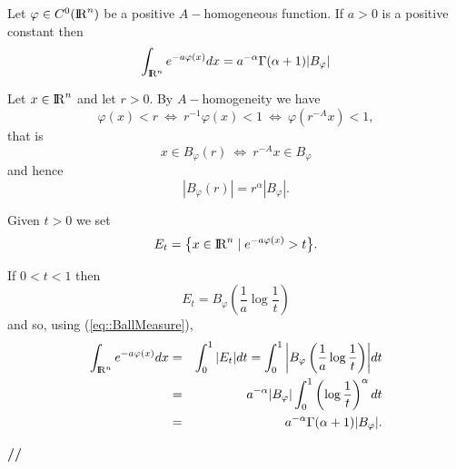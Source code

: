 \documentclass[12pt,a4paper]{amsart}
\begin{document}
{\begin{proposition}\label{prop::GbellIntegral}
Let ${\varphi}\in C^0({{\rm I\kern-.185em R}}^{n})$ be a positive
${A}-$homogeneous function.
If ${a}>0$ is a positive constant then
\begin{equation}\label{eq::GbellIntegral}
\int_{{{\rm I\kern-.185em R}}^{n}}e^{-a{\varphi}({x})}d{x}
=a^{-{\alpha}}\Gamma({\alpha}+1)|{B}_{\varphi}|
\end{equation}
\end{proposition}

{\removelastskip\par\medskip\goodbreak{}}
Let ${x}\in{{\rm I\kern-.185em R}}^{n}$ and let ${r}>0$.
By ${A}-$homogeneity we have
\begin{equation}\nonumber
	{\varphi}({x})<{r}\ \Longleftrightarrow\ 
	{r}^{-1}{\varphi}({x})<1\ \Longleftrightarrow\ 
	{\varphi}({r}^{-{A}}{x})<1,
\end{equation}
that is
\begin{equation}\nonumber
	{x}\in{B}_{\varphi}({r})\ \Longleftrightarrow\ 
	{r}^{-{A}}{x}\in{B}_{\varphi}
\end{equation}
and hence
\begin{equation}\label{eq::BallMeasure}
	{\left|{{B}_{\varphi}({r})}\right|}=
	{r}^{\alpha}{\left|{{B}_{\varphi}}\right|}.
\end{equation}

Given ${t}>0$ we set
\begin{equation}\nonumber
{E}_{t}=\bigl\{
	{x}\in{{\rm I\kern-.185em R}}^{n}\mid e^{-a{\varphi}({x})}>{t}
\bigr\}.
\end{equation}

If $0<{t}<1$ then
\begin{equation}\nonumber
{E}_{t}={B}_{\varphi}
	\left(
		\frac{1}{a}\log\frac{1}{t}
	\right)
\end{equation}
and so, using (\ref{eq::BallMeasure}),
\begin{eqnarray}
	\int_{{{\rm I\kern-.185em R}}^{n}}e^{-a{\varphi}({x})}d{x}&=&
	\int_0^1{\left|{{E}_{t}}\right|}d{t}
	=\int_0^1{\left|{{B}_{\varphi}
	\left(
		\frac{1}{a}\log\frac{1}{t}
	\right)
	}\right|}d{t}
\nonumber\\
	&=&{a}^{-{\alpha}}|{B}_{\varphi}|
	\int_0^1
	\left(
		\log\frac{1}{t}
	\right)^{\alpha}
	d{t}
\nonumber\\
	&=&a^{-{\alpha}}\Gamma({\alpha}+1)|{B}_{\varphi}|.
\nonumber
\end{eqnarray}
{{\bf //}\par\smallskip}

}
\end{document}
